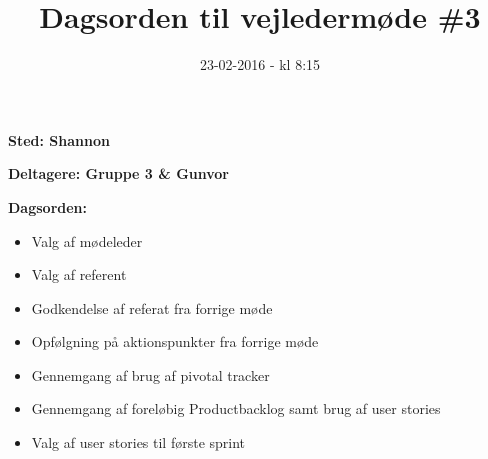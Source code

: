 \documentclass{article}
\title{Dagsorden til vejledermøde \#3}
\date{23-02-2016 - kl 8:15}
\begin{document}
	\maketitle

	\textbf{Sted: Shannon}
	
	\textbf{Deltagere: Gruppe 3 \& Gunvor}
	
	\textbf{Dagsorden:}
	\begin{itemize}
		\item Valg af mødeleder
		\item Valg af referent
		\item Godkendelse af referat fra forrige møde 
		\item Opfølgning på aktionspunkter fra forrige møde
		\item Gennemgang af brug af pivotal tracker
		\item Gennemgang af foreløbig Productbacklog samt brug af user stories
		\item Valg af user stories til første sprint 
	\end{itemize}
\end{document}
